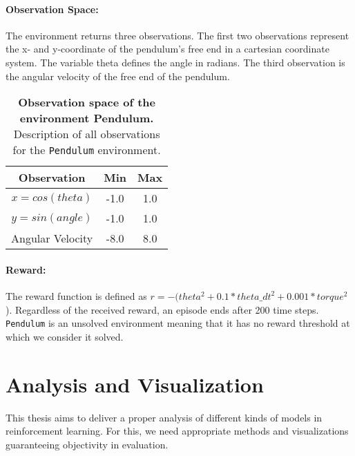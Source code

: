 \paragraph*{Observation Space:} The environment returns three observations. The first two observations represent the x- and y-coordinate of the pendulum's free end in a cartesian coordinate system. The variable theta defines the angle in radians. The third observation is the angular velocity of the free end of the pendulum.

\begin{table}[!ht]
  \centering
  \begin{tabular}{ |c|c|c| }
    \hline
    Observation & Min & Max \\
    \hline
    $x = cos(theta)$ & -1.0 & 1.0 \\
    $y = sin(angle)$ & -1.0 & 1.0 \\
    Angular Velocity & -8.0 & 8.0 \\
    \hline
  \end{tabular}
  \caption[Observation space of the environment Pendulum]{
    \textbf{Observation space of the environment Pendulum.}
    Description of all observations for the \texttt{Pendulum} environment.
  }
  \label{table:pendulum_obs}
\end{table}

\paragraph*{Reward:} The reward function is defined as $r = -(theta^2 + 0.1 * theta\_dt^2 + 0.001 * torque^2$). Regardless of the received reward, an episode ends after 200 time steps. \verb|Pendulum| is an unsolved environment meaning that it has no reward threshold at which we consider it solved.


\section{Analysis and Visualization}
\label{sec:benchmarks}
This thesis aims to deliver a proper analysis of different kinds of models in reinforcement learning. For this, we need appropriate methods and visualizations guaranteeing objectivity in evaluation.
